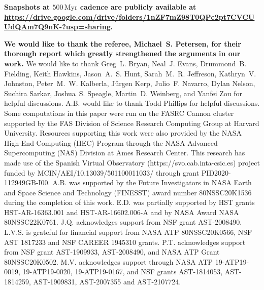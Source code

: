 \documentclass[twocolumn,linenumbers,trackchanges]{aastex631}
\begin{document}
{\bf Snapshots at $500\,\textrm{Myr}$ cadence are publicly available at
\url{https://drive.google.com/drive/folders/1nZF7mZ98T0QPc2pt7CVCUUdQAm7Q9nK-?usp=sharing}.}

\begin{acknowledgments}
  {\bf We would like to thank the referee, Michael~S. Petersen, for their
  thorough report which greatly strengthened the arguments in our work.} We
  would like to thank Greg~L. Bryan, Neal~J. Evans, Drummond~B. Fielding, Keith
  Hawkins, Jason~A.~S. Hunt, Sarah~M.~R. Jeffreson, Kathryn~V. Johnston,
  Peter~M.~W. Kalberla, Jürgen Kerp, Julio~F. Navarro, Dylan Nelson, Suchira
  Sarkar, Joshua~S. Speagle, Martin~D. Weinberg, and Yanfei Zou for helpful
  discussions. A.B. would like to thank Todd Phillips for helpful discussions.
  Some computations in this paper were run on the FASRC Cannon cluster supported
  by the FAS Division of Science Research Computing Group at Harvard University.
  Resources supporting this work were also provided by the NASA High-End
  Computing (HEC) Program through the NASA Advanced Supercomputing (NAS)
  Division at Ames Research Center. This research has made use of the Spanish
  Virtual Observatory (https://svo.cab.inta-csic.es) project funded by
  MCIN/AEI/10.13039/501100011033/ through grant PID2020-112949GB-I00. A.B. was
  supported by the Future Investigators in NASA Earth and Space Science and
  Technology (FINESST) award number 80NSSC20K1536 during the completion of this
  work. E.D. was partially supported by HST grants HST-AR-16363.001 and
  HST-AR-16602.006-A and by NASA Award NASA 80NSSC22K0761. J.Q. acknowledges
  support from NSF grant AST-2008490. L.V.S. is grateful for financial support
  from NASA ATP 80NSSC20K0566, NSF AST 1817233 and NSF CAREER 1945310 grants.
  P.T. acknowledges support from NSF grant AST-1909933, AST-2008490, and NASA
  ATP Grant 80NSSC20K0502. M.V. acknowledges support through NASA ATP
  19-ATP19-0019, 19-ATP19-0020, 19-ATP19-0167, and NSF grants AST-1814053,
  AST-1814259, AST-1909831, AST-2007355 and AST-2107724.
\end{acknowledgments}

\end{document}
